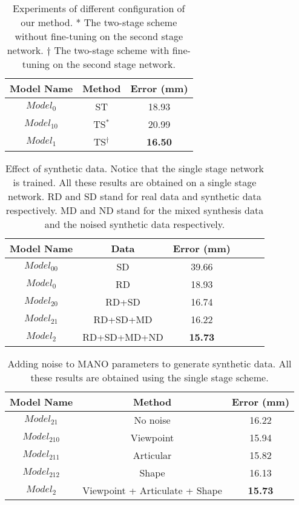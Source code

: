 \documentclass{article}
\begin{document}
\begin{table}[t]
\centering
\begin{tabular}{ccc}
\hline
Model Name & Method & Error (mm) \\ \hline
$Model_0$ & ST & 18.93\\  \hline
$Model_{10}$ & TS$^*$  & 20.99 \\ \hline
$Model_1$ & TS$^\dagger$ & \textbf{16.50} \\
\hline
\end{tabular}	\caption{\label{tab:ablation_finetune} Experiments of different configuration of our method. * The two-stage scheme without fine-tuning on the second stage network. $\dagger$ The two-stage scheme with fine-tuning on the second stage network.}
\end{table}

\begin{table}[t]
\centering
\begin{tabular}{cccccc}
\hline
Model Name & Data & Error (mm) \\ \hline
$Model_{00}$ & SD & 39.66 \\ \hline
$Model_0$ & RD & 18.93 \\ \hline
$Model_{20}$ & RD+SD & 16.74 \\ \hline
$Model_{21}$ & RD+SD+MD & 16.22 \\ \hline 
$Model_2$ & RD+SD+MD+ND & \textbf{15.73} \\
\hline
\end{tabular}	\caption{\label{tab:systhetic_result} Effect of synthetic data. Notice that the single stage network is trained. All these results are obtained on a single stage network. RD and SD stand for real data and synthetic data respectively. MD and ND stand for the mixed synthesis data and the noised synthetic data respectively.}
\end{table}

\begin{table}[!t] \small
\centering
\begin{tabular}{ccc}
\hline
Model Name & Method & Error (mm) \\ \hline
$Model_{21}$ & No noise & 16.22 \\
$Model_{210}$ & Viewpoint & 15.94 \\
$Model_{211}$ & Articular & 15.82 \\
$Model_{212}$ & Shape & 16.13 \\
$Model_2$ & Viewpoint + Articulate + Shape & \textbf{15.73} \\
\hline
\end{tabular}	\caption{\label{tab:add_noise_result}  Adding noise to MANO parameters to generate synthetic data. All these results are obtained using the single stage scheme.}
\end{table}
\end{document}
